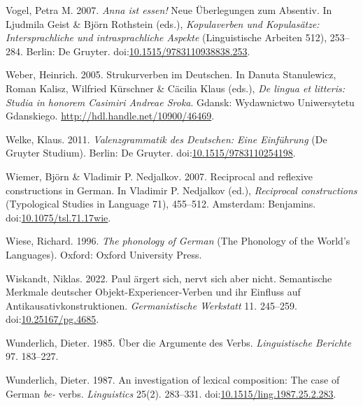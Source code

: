 \leavevmode{}%
Vogel, Petra M. 2007. \emph{Anna ist essen!} {Neue} {Überlegungen} zum
{Absentiv}. In Ljudmila Geist \& Björn Rothstein (eds.),
\emph{Kopulaverben und {Kopulasätze}: {Intersprachliche} und
intrasprachliche {Aspekte}} (Linguistische Arbeiten 512), 253--284.
Berlin: De Gruyter.
doi:\href{https://doi.org/10.1515/9783110938838.253}{10.1515/9783110938838.253}.

\leavevmode{}%
Weber, Heinrich. 2005. Strukurverben im {Deutschen}. In Danuta
Stanulewicz, Roman Kalisz, Wilfried Kürschner \& Cäcilia Klaus (eds.),
\emph{De lingua et litteris: Studia in honorem {Casimiri Andreae
Sroka}}. Gdansk: Wydawnictwo Uniwersytetu Gdanskiego.
\url{http://hdl.handle.net/10900/46469}.

\leavevmode{}%
Welke, Klaus. 2011. \emph{Valenzgrammatik des {Deutschen}: Eine
{Einführung}} (De Gruyter Studium). Berlin: De Gruyter.
doi:\href{https://doi.org/10.1515/9783110254198}{10.1515/9783110254198}.

\leavevmode{}%
Wiemer, Björn \& Vladimir P. Nedjalkov. 2007. Reciprocal and reflexive
constructions in {German}. In Vladimir P. Nedjalkov (ed.),
\emph{Reciprocal constructions} (Typological Studies in Language 71),
455--512. Amsterdam: Benjamins.
doi:\href{https://doi.org/10.1075/tsl.71.17wie}{10.1075/tsl.71.17wie}.

\leavevmode{}%
Wiese, Richard. 1996. \emph{The phonology of {German}} (The Phonology of
the World's Languages). Oxford: Oxford University Press.

\leavevmode{}%
Wiskandt, Niklas. 2022. Paul ärgert sich, nervt sich aber nicht.
Semantische {Merkmale} deutscher {Objekt-Experiencer-Verben} und ihr
{Einfluss} auf {Antikausativkonstruktionen}. \emph{Germanistische
Werkstatt} 11. 245--259.
doi:\href{https://doi.org/10.25167/pg.4685}{10.25167/pg.4685}.

\leavevmode{}%
Wunderlich, Dieter. 1985. Über die {Argumente} des {Verbs}.
\emph{Linguistische Berichte} 97. 183--227.

\leavevmode{}%
Wunderlich, Dieter. 1987. An investigation of lexical composition: The
case of {German} \emph{be-} verbs. \emph{Linguistics} 25(2). 283--331.
doi:\href{https://doi.org/10.1515/ling.1987.25.2.283}{10.1515/ling.1987.25.2.283}.

